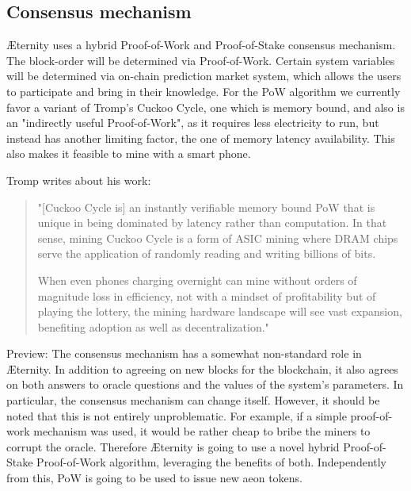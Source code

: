 \documentclass[a4paper, 10pt, conference]{ieeeconf}      %
\begin{document}
\begin{draft}
\subsection{Consensus mechanism}
\label{sec:consensus}
Æternity uses a hybrid Proof-of-Work and Proof-of-Stake consensus mechanism. The block-order will be determined via Proof-of-Work. Certain system variables will be determined via on-chain prediction market system, which allows the users to participate and bring in their knowledge. For the PoW algorithm we currently favor a variant of Tromp's Cuckoo Cycle, one which is memory bound, and also is an "indirectly useful Proof-of-Work", as it requires less electricity to run, but instead has another limiting factor, the one of memory latency availability. This also makes it feasible to mine with a smart phone.%

Tromp writes about his work:

\begin{quote}"[Cuckoo Cycle is] an instantly verifiable memory bound PoW that is unique in being dominated by latency rather than computation. In that sense, mining Cuckoo Cycle is a form of ASIC mining where DRAM chips serve the application of randomly reading and writing billions of bits.

When even phones charging overnight can mine without orders of magnitude loss in efficiency, not with a mindset of profitability but of playing the lottery, the mining hardware landscape will see vast expansion, benefiting adoption as well as decentralization." 
\end{quote}


Preview: The consensus mechanism has a somewhat non-standard role in Æternity. In addition to agreeing on new blocks for the blockchain, it also agrees on both answers to oracle questions and the values of the system's parameters. In particular, the consensus mechanism can change itself. However, it should be noted that this is not entirely unproblematic. For example, if a simple proof-of-work mechanism was used, it would be rather cheap to bribe the miners to corrupt the oracle. Therefore Æternity is going to use a novel hybrid Proof-of-Stake Proof-of-Work algorithm, leveraging the benefits of both. Independently from this, PoW is going to be used to issue new aeon tokens.


\end{draft}
\end{document}
